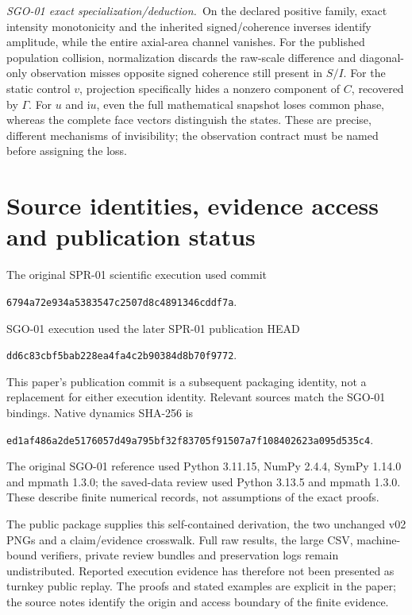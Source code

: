 \documentclass[11pt,a4paper]{article}
\newcommand{\ii}{\mathrm i}\newcommand{\tr}{\operatorname{tr}}
\newcommand{\deduction}{\textit{SGO-01 exact specialization/deduction.}}
\begin{document}
\deduction\ On the declared positive family, exact intensity monotonicity and the inherited signed/coherence inverses identify amplitude, while the entire axial-area channel vanishes. For the published population collision, normalization discards the raw-scale difference and diagonal-only observation misses opposite signed coherence still present in $S/I$. For the static control $v$, projection specifically hides a nonzero component of $C$, recovered by $\Gamma$. For $u$ and $\ii u$, even the full mathematical snapshot loses common phase, whereas the complete face vectors distinguish the states. These are precise, different mechanisms of invisibility; the observation contract must be named before assigning the loss.

\section*{Source identities, evidence access and publication status}
The original SPR-01 scientific execution used commit
\begin{center}\small\texttt{6794a72e934a5383547c2507d8c4891346cddf7a}.\end{center}
SGO-01 execution used the later SPR-01 publication HEAD
\begin{center}\small\texttt{dd6c83cbf5bab228ea4fa4c2b90384d8b70f9772}.\end{center}
This paper's publication commit is a subsequent packaging identity, not a replacement for either execution identity. Relevant sources match the SGO-01 bindings. Native dynamics SHA-256 is
\begin{center}\small\texttt{ed1af486a2de5176057d49a795bf32f83705f91507a7f108402623a095d535c4}.\end{center}
The original SGO-01 reference used Python 3.11.15, NumPy 2.4.4, SymPy 1.14.0 and mpmath 1.3.0; the saved-data review used Python 3.13.5 and mpmath 1.3.0. These describe finite numerical records, not assumptions of the exact proofs.

The public package supplies this self-contained derivation, the two unchanged v02 PNGs and a claim/evidence crosswalk. Full raw results, the large CSV, machine-bound verifiers, private review bundles and preservation logs remain undistributed. Reported execution evidence has therefore not been presented as turnkey public replay. The proofs and stated examples are explicit in the paper; the source notes identify the origin and access boundary of the finite evidence.
\end{document}
